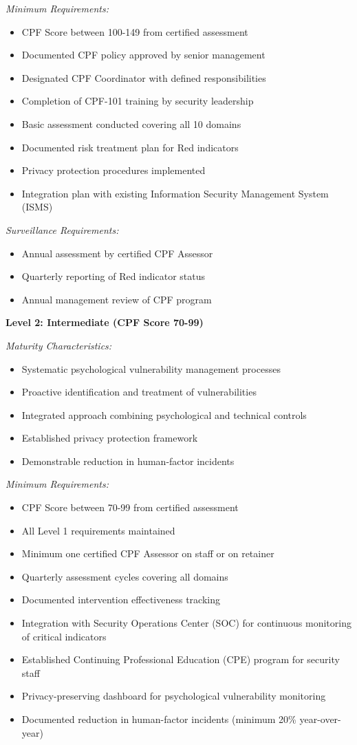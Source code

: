 \documentclass[11pt,a4paper]{article}
\begin{document}
\textit{Minimum Requirements:}
\begin{itemize}
\item CPF Score between 100-149 from certified assessment
\item Documented CPF policy approved by senior management
\item Designated CPF Coordinator with defined responsibilities
\item Completion of CPF-101 training by security leadership
\item Basic assessment conducted covering all 10 domains
\item Documented risk treatment plan for Red indicators
\item Privacy protection procedures implemented
\item Integration plan with existing Information Security Management System (ISMS)
\end{itemize}

\textit{Surveillance Requirements:}
\begin{itemize}
\item Annual assessment by certified CPF Assessor
\item Quarterly reporting of Red indicator status
\item Annual management review of CPF program
\end{itemize}

\textbf{Level 2: Intermediate (CPF Score 70-99)}

\textit{Maturity Characteristics:}
\begin{itemize}
\item Systematic psychological vulnerability management processes
\item Proactive identification and treatment of vulnerabilities
\item Integrated approach combining psychological and technical controls
\item Established privacy protection framework
\item Demonstrable reduction in human-factor incidents
\end{itemize}

\textit{Minimum Requirements:}
\begin{itemize}
\item CPF Score between 70-99 from certified assessment
\item All Level 1 requirements maintained
\item Minimum one certified CPF Assessor on staff or on retainer
\item Quarterly assessment cycles covering all domains
\item Documented intervention effectiveness tracking
\item Integration with Security Operations Center (SOC) for continuous monitoring of critical indicators
\item Established Continuing Professional Education (CPE) program for security staff
\item Privacy-preserving dashboard for psychological vulnerability monitoring
\item Documented reduction in human-factor incidents (minimum 20\% year-over-year)
\end{itemize}
\end{document}
